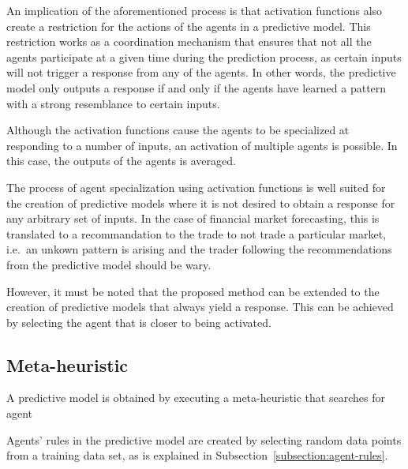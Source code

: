 \documentclass[review]{elsarticle}
\begin{document}
An implication of the aforementioned process is that activation functions also
create a restriction for the actions of the agents in a predictive model. This
restriction works as a coordination mechanism that ensures that not all the
agents participate at a given time during the prediction process, as certain
inputs will not trigger a response from any of the agents. In other words, the
predictive model only outputs a response if and only if the agents have learned
a pattern with a strong resemblance to certain inputs.

Although the activation functions cause the agents to be specialized at
responding to a number of inputs, an activation of multiple agents is
possible. In this case, the outputs of the agents is averaged. %

The process of agent specialization using activation functions is well suited
for the creation of predictive models where it is not desired to obtain a
response for any arbitrary set of inputs. In the case of financial market
forecasting, this is translated to a recommandation to the trade to not trade a
particular market, i.e.\ an unkown pattern is arising and the trader following
the recommendations from the predictive model should be wary.

However, it must be noted that the proposed method can be extended to the
creation of predictive models that always yield a response. This can be
achieved by selecting the agent that is closer to being activated.


\subsection{Meta-heuristic}
\label{subsection:meta-heuristic}

A predictive model is obtained by executing a meta-heuristic that
searches for agent

Agents' rules in the predictive model are created by selecting random
data points from a training data set, as is explained in
Subsection~\ref{subsection:agent-rules}.

\end{document}
